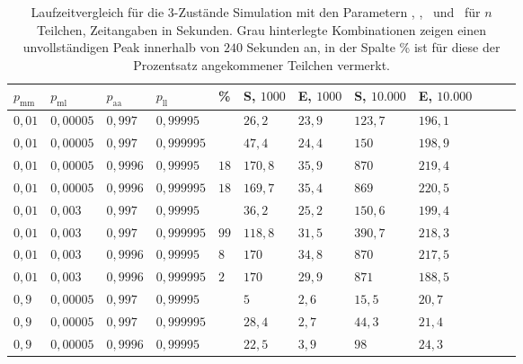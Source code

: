 \begin{table}[h]
\centering 
\caption[Laufzeitvergleich für die 3-Zustände Simulation]{Laufzeitvergleich für die 3-Zustände Simulation mit den Parametern \pmm, \pml, \paa\ und \pll\ für $n$ Teilchen, Zeitangaben in Sekunden. Grau hinterlegte Kombinationen zeigen einen unvollständigen Peak innerhalb von $240$ Sekunden an, in der Spalte \% ist für diese der Prozentsatz angekommener Teilchen vermerkt.}
\label{3s_laufzeit}
\begin{tabular}{|l|l|l|l||l||l|l|l|l|l|l|l|}
\hline
$p_\text{mm}$ & $p_\text{ml}$ & $p_\text{aa}$ & $p_\text{ll}$ & \%& S, $1000$ & E, $1000$ & S, $10.000$ & E, $10.000$ \\ \hline \hline
$ 0,01 $ & $0,00005$ & $0,997$  & $0,99995$  && $26,2   $ & $23,9  $ & $123,7 $ & $196,1 $  \\ \hline
$ 0,01 $ & $0,00005$ & $0,997$  & $0,999995$ && $47,4   $ & $24,4  $ & $150   $ & $198,9 $  \\ \hline
\cellcolor{gray!40}$ 0,01 $ & \cellcolor{gray!40}$0,00005$ &\cellcolor{gray!40}$0,9996$ &\cellcolor{gray!40}$0,99995$  &$18$& $170,8 $ & $35,9  $ & $870   $ & $219,4 $  \\ \hline
\cellcolor{gray!40}$ 0,01 $ & \cellcolor{gray!40}$0,00005$ &\cellcolor{gray!40}$0,9996$ & \cellcolor{gray!40}$0,999995$ &$18$& $169,7 $ & $35,4  $ & $869   $ & $220,5 $  \\ \hline
$ 0,01 $ & $0,003 $  & $0,997$  & $0,99995$  && $36,2   $ & $25,2  $ & $150,6 $ & $199,4 $  \\ \hline
\cellcolor{gray!40}$ 0,01 $ & \cellcolor{gray!40}$0,003 $  & \cellcolor{gray!40}$0,997$  & \cellcolor{gray!40}$0,999995$ &$99$& $118,8$ & $31,5  $ & $390,7 $ & $218,3 $  \\ \hline
\cellcolor{gray!40}$ 0,01 $ & \cellcolor{gray!40}$0,003 $  & \cellcolor{gray!40}$0,9996$ & \cellcolor{gray!40}$0,99995$  &$8$& $170   $ & $34,8  $ & $870   $ & $217,5 $  \\ \hline
\cellcolor{gray!40}$ 0,01 $ & \cellcolor{gray!40}$0,003 $  & \cellcolor{gray!40}$0,9996$ & \cellcolor{gray!40}$0,999995$ &$2$& $170   $ & $29,9  $ & $871   $ & $188,5 $  \\ \hline
$ 0,9  $ & $0,00005$ & $0,997$  & $0,99995$  && $5      $ & $2,6 $   & $15,5  $ & $20,7 $  \\ \hline
$ 0,9  $ & $0,00005$ & $0,997$  & $0,999995$ && $28,4   $ & $2,7 $   & $44,3  $ & $21,4 $  \\ \hline
$ 0,9  $ & $0,00005$ & $0,9996$ & $0,99995$  && $22,5   $ & $3,9 $   & $98    $ & $24,3 $  \\ \hline

\end{tabular}
\end{table}
